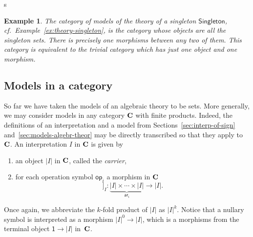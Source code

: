 s\documentclass{amsart}
\newcommand{\theory}[1]{\mathsf{#1}} %
\newcommand{\category}[1]{\text{\textbf{#1}}} %
\newcommand{\carrier}[1]{|#1|} %
\newcommand{\op}[1]{\mathsf{op}_{#1}} %
\newcommand{\arity}[1]{\mathsf{ar}_{#1}} %
\newcommand{\one}{\mathsf{1}} %
\newcommand{\sem}[1]{[\![#1]\!]} %
\newtheorem{example}[definition]{Example}
\begin{document}
\begin{example}
  The category of models of the theory of a singleton $\theory{Singleton}$, cf.\
  Example~\ref{ex:theory-singleton}, is the category whose objects are all the singleton
  sets. There is precisely one morphisms between any two of them. This category is
  equivalent to the trivial category which has just one object and one morphism.
\end{example}

\subsection{Models in a category}
\label{sec:models-category}

So far we have taken the models of an algebraic theory to be sets. More generally, we may
consider models in any category $\category{C}$ with finite products. Indeed, the
definitions of an interpretation and a model from Sections~\ref{sec:interp-of-sign}
and~\ref{sec:models-algebr-theor} may be directly transcribed so that they apply
to~$\category{C}$. An interpretation $I$ in $\category{C}$ is given by
%
\begin{enumerate}
\item an object $\carrier{I}$ in $\category{C}$, called the \emph{carrier},
\item for each operation symbol $\op{i}$ a morphism in $\category{C}$
  \begin{equation*}
    \sem{\op{i}}_I : \underbrace{\carrier{I} \times \cdots \times \carrier{I}}_{\arity{i}} \to \carrier{I}.
  \end{equation*}
\end{enumerate}
%
Once again, we abbreviate the $k$-fold product of $\carrier{I}$ as $\carrier{I}^k$. Notice that a nullary
symbol is interpreted as a morphism $\carrier{I}^0 \to \carrier{I}$, which is a morphisms from the
terminal object $\one \to \carrier{I}$ in~$\category{C}$.
\end{document}
